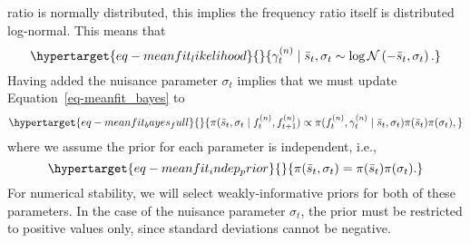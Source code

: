 \documentclass[
]{scrartcl}
\begin{document}
\begin{refsegment}
ratio is normally distributed, this implies the frequency ratio itself
is distributed log-normal. This means that
\begin{equation}\protect\hypertarget{eq-meanfit_likelihood}{}{
\gamma_t^{(n)} \mid \bar{s}_t, \sigma_t  \sim 
\log \mathcal{N}\left(-\bar{s}_t, \sigma_t \right).
}\label{eq-meanfit_likelihood}\end{equation} Having added the nuisance
parameter \(\sigma_t\) implies that we must update
Equation~\ref{eq-meanfit_bayes} to
\begin{equation}\protect\hypertarget{eq-meanfit_bayes_full}{}{
\pi(\bar{s}_t, \sigma_t \mid f_t^{(n)}, f_{t+1}^{(n)}) \propto
\pi(f_t^{(n)}, \gamma_t^{(n)} \mid \bar{s}_t, \sigma_t) 
\pi(\bar{s}_t) \pi(\sigma_t),
}\label{eq-meanfit_bayes_full}\end{equation} where we assume the prior
for each parameter is independent, i.e.,
\begin{equation}\protect\hypertarget{eq-meanfit_indep_prior}{}{
\pi(\bar{s}_t, \sigma_t) = \pi(\bar{s}_t) \pi(\sigma_t).
}\label{eq-meanfit_indep_prior}\end{equation} For numerical stability,
we will select weakly-informative priors for both of these parameters.
In the case of the nuisance parameter \(\sigma_t\), the prior must be
restricted to positive values only, since standard deviations cannot be
negative.


\end{refsegment}
\end{document}
